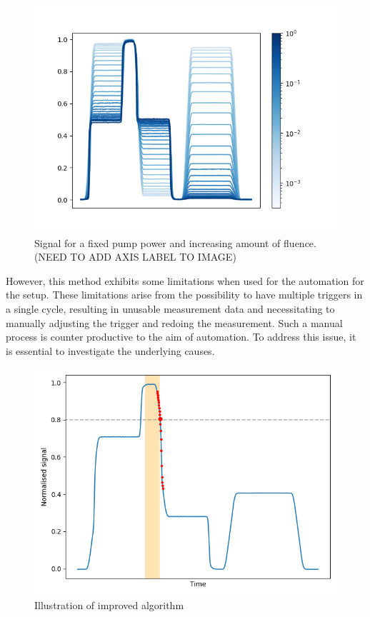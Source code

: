 \begin{figure}
    \vspace{-\baselineskip}
    \centering
    \includegraphics[width=.98\textwidth]{images/trace_complete.png}
    \caption{Signal for a fixed pump power and increasing amount of fluence. (NEED TO ADD AXIS LABEL TO IMAGE)}
    \label{fig:complete}
\end{figure}

However, this method exhibits some limitations when used for the automation for the setup. These limitations arise from the possibility to have multiple triggers in a single cycle, resulting in unusable measurement data and necessitating to manually adjusting the trigger and redoing the measurement. Such a manual process is counter productive to the aim of automation. To address this issue, it is essential to investigate the underlying causes.
\begin{figure}
    \vspace{-\baselineskip}
    \centering
    \includegraphics[width=.98\textwidth]{images/corrected_signal.png}
    \caption{Illustration of improved algorithm}
    \label{fig:corrected}
\end{figure}


